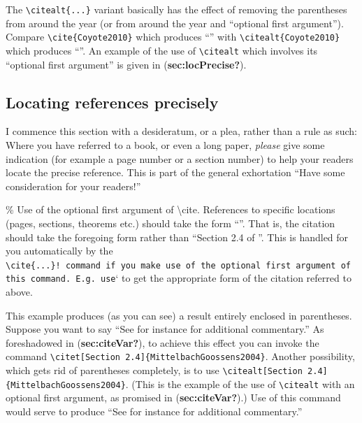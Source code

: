 \documentclass[
  times,
  doublespace]{anzsauth}
\begin{document}
The \texttt{\textbackslash{}citealt\{...\}} variant basically has the
effect of removing the parentheses from around the year (or from around
the year and ``optional first argument''). Compare
\texttt{\textbackslash{}cite\{Coyote2010\}} which produces
``\cite{Coyote2010}'' with
\texttt{\textbackslash{}citealt\{Coyote2010\}} which produces
``\citealt{Coyote2010}''. An example of the use of
\texttt{\textbackslash{}citealt} which involves its ``optional first
argument'' is given in (\textbf{sec:locPrecise?}).

\subsection{Locating references precisely}\label{sec:locPrecise}

I commence this section with a desideratum, or a plea, rather than a
rule as such: Where you have referred to a book, or even a long paper,
\emph{please} give some indication (for example a page number or a
section number) to help your readers locate the precise reference. This
is part of the general exhortation ``Have some consideration for your
readers!''

\% Use of the optional first argument of \textbackslash cite. References
to specific locations (pages, sections, theorems etc.) should take the
form ``\cite[Section 2.4]{MittelbachGoossens2004}''. That is, the
citation should take the foregoing form rather than ``Section 2.4 of
\cite{MittelbachGoossens2004}''. This is handled for you automatically
by the
\texttt{\textbackslash{}cite\{...\}!\ command\ if\ you\ make\ use\ of\ the\ optional\ first\ argument\ of\ this\ command.\ E.g.\ use}\cite[Section 2.4]{MittelbachGoossens2004}`
to get the appropriate form of the citation referred to above.

This example produces (as you can see) a result entirely enclosed in
parentheses. Suppose you want to say ``See for instance
\citet[Section 2.4]{MittelbachGoossens2004} for additional commentary.''
As foreshadowed in (\textbf{sec:citeVar?}), to achieve this effect you
can invoke the command
\texttt{\textbackslash{}citet{[}Section\ 2.4{]}\{MittelbachGoossens2004\}}.
Another possibility, which gets rid of parentheses completely, is to use
\texttt{\textbackslash{}citealt{[}Section\ 2.4{]}\{MittelbachGoossens2004\}}.
(This is the example of the use of \texttt{\textbackslash{}citealt} with
an optional first argument, as promised in (\textbf{sec:citeVar?}).) Use
of this command would serve to produce ``See for instance
\citealt[Section
2.4]{MittelbachGoossens2004} for additional commentary.''
\end{document}
